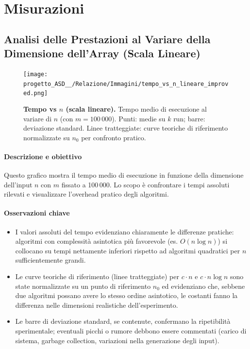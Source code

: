 \documentclass[a4paper, 11pt]{article}
\begin{document}
\section{Misurazioni}

\subsection{Analisi delle Prestazioni al Variare della Dimensione dell'Array (Scala Lineare)}
\begin{figure}[H]
    \centering
    \texttt{[image: progetto\_ASD\_\_/Relazione/Immagini/tempo\_vs\_n\_lineare\_improved.png]}
    \caption {\textbf{Tempo vs \(n\) (scala lineare).} Tempo medio di esecuzione al variare di \(n\) (con \(m=100\,000\)). Punti: medie su \(k\) run; barre: deviazione standard. Linee tratteggiate: curve teoriche di riferimento normalizzate su \(n_0\) per confronto pratico.}
    \label{fig:grafico}
\end{figure}

\paragraph{Descrizione e obiettivo}
Questo grafico mostra il tempo medio di esecuzione in funzione della dimensione dell'input \(n\) con \(m\) fissato a 100\,000. Lo scopo è confrontare i tempi assoluti rilevati e visualizzare l'overhead pratico degli algoritmi.

\paragraph{Osservazioni chiave}
\begin{itemize}
  \item I valori assoluti del tempo evidenziano chiaramente le differenze pratiche: algoritmi con complessità asintotica più favorevole (es. \(O(n\log n)\)) si collocano su tempi nettamente inferiori rispetto ad algoritmi quadratici per \(n\) sufficientemente grandi.
  \item Le curve teoriche di riferimento (linee tratteggiate) per \(c\cdot n\) e \(c\cdot n\log n\) sono state normalizzate su un punto di riferimento \(n_0\) ed evidenziano che, sebbene due algoritmi possano avere lo stesso ordine asintotico, le costanti fanno la differenza nelle dimensioni realistiche dell'esperimento.
  \item Le barre di deviazione standard, se contenute, confermano la ripetibilità sperimentale; eventuali picchi o rumore debbono essere commentati (carico di sistema, garbage collection, variazioni nella generazione degli input).
\end{itemize}
\end{document}

